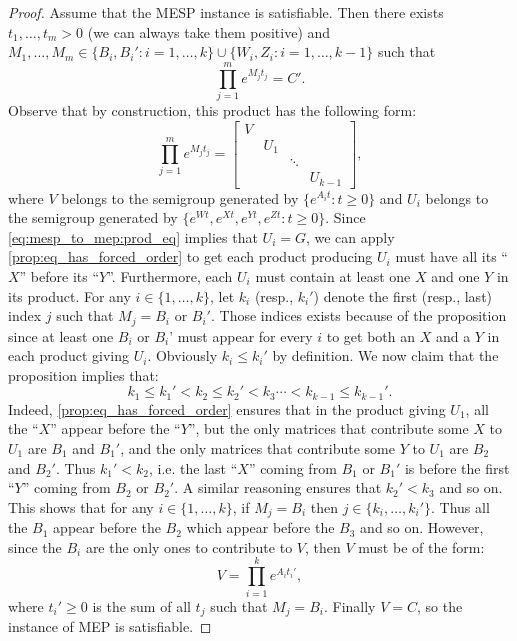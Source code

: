 \begin{proof}
Assume that the MESP instance is satisfiable. Then there exists $t_1,\ldots,t_m>0$ (we can always take them positive)
and $M_1,\ldots,M_m\in\big\lbrace B_{i},B_{i}':i=1,\ldots,k\rbrace\cup\big\lbrace W_{i},Z_{i}:i=1,\ldots,k-1\big\rbrace$
such that
\begin{equation}\label{eq:mesp_to_mep:prod_eq}
\prod_{j=1}^{m}e^{M_{j}t_{j}}=C'.
\end{equation}
Observe that by construction, this product has the following form:
\[\prod_{j=1}^{m}e^{M_{j}t_{j}}=\begin{bmatrix}V&&&\\&U_1&&\\&&\ddots&\\&&&U_{k-1}\end{bmatrix},\]
where $V$ belongs to the semigroup generated by $\lbrace e^{A_{i}t}:t\geqslant0\rbrace$ and $U_{i}$ belongs
to the semigroup generated by $\lbrace e^{Wt},e^{Xt},e^{Yt},e^{Zt}:t\geqslant0\rbrace$. Since
\eqref{eq:mesp_to_mep:prod_eq} implies that $U_{i}=G$, we can apply \cref{prop:eq_has_forced_order}
to get each product producing $U_{i}$ must have all its ``$X$'' before its ``$Y$''. Furthermore, each $U_{i}$
must contain at least one $X$ and one $Y$ in its product. For any $i\in\lbrace 1,\ldots,k\rbrace$,
let $k_{i}$ (resp., $k_{i}'$) denote
the first (resp., last) index $j$ such that $M_{j}=B_{i}\text{ or }B_{i}'$. Those indices exists because
of the proposition since at least one $B_{i}$ or $B_{i}$' must appear for every $i$
to get both an $X$ and a $Y$ in each product giving $U_{i}$. Obviously $k_{i}\leqslant k_{i}'$
by definition. We now claim that the proposition implies that:
\[k_1\leqslant k_1'<k_2\leqslant k_2'<k_3\cdots<k_{k-1}\leqslant k_{k-1}'.\]
Indeed, \cref{prop:eq_has_forced_order} ensures that in the product giving $U_1$,
all the ``$X$'' appear before the ``$Y$'',
but the only matrices that contribute some $X$ to $U_1$ are $B_1$ and $B_1'$,
and the only matrices that contribute some $Y$ to $U_1$ are $B_2$ and $B_2'$.
Thus $k_1'<k_2$, i.e. the last ``$X$'' coming from $B_1$ or $B_1'$ is before the first ``$Y$''
coming from $B_2$ or $B_2'$. A similar reasoning ensures that $k_2'<k_3$ and so on.
This shows that for any $i\in\lbrace 1,\ldots,k\rbrace$, if $M_{j}=B_{i}$ then $j\in\lbrace k_{i},\ldots,k_{i}'\rbrace$. Thus all
the $B_1$ appear before the $B_2$ which appear before the $B_3$ and so on.
However, since the $B_{i}$ are the only ones to contribute to $V$, then $V$ must be of the form:
\[V=\prod_{i=1}^{k}e^{A_{i}t_{i}'},\]
where $t_{i}'\geqslant0$ is the sum of all $t_{j}$ such that $M_{j}=B_{i}$.
Finally $V=C$, so the instance of MEP is satisfiable.

\end{proof}
